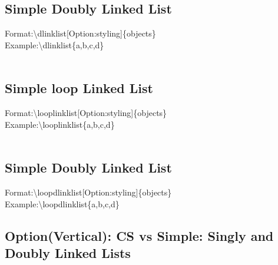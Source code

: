 \documentclass[a4paper]{article}
\begin{document}
\subsection{Simple Doubly Linked List}
Format:{\textbackslash}dlinklist[Option:styling]{\{}objects{\}}\\
Example:{\textbackslash}dlinklist{\{}a,b,c,d{\}} \newline \\
\begin{adjustbox}{width=0.5\paperwidth,center,keepaspectratio}
\end{adjustbox}\\
\subsection{Simple loop Linked List}
Format:{\textbackslash}looplinklist[Option:styling]{\{}objects{\}}\\
Example:{\textbackslash}looplinklist{\{}a,b,c,d{\}} \newline \\
\begin{adjustbox}{width=0.5\paperwidth,center,keepaspectratio}
\end{adjustbox}\\
\subsection{Simple Doubly Linked List}
Format:{\textbackslash}loopdlinklist[Option:styling]{\{}objects{\}}\\
Example:{\textbackslash}loopdlinklist{\{}a,b,c,d{\}} \newline \\
\begin{adjustbox}{width=0.5\paperwidth,center,keepaspectratio}
\end{adjustbox}
\newpage
\subsection{Option(Vertical): CS vs Simple: Singly and Doubly Linked Lists}

\begin{center}
\begin{adjustbox}{height=0.6\paperheight,width=\paperwidth,center,keepaspectratio}
\end{adjustbox}
\end{center}
\newpage
\end{document}
